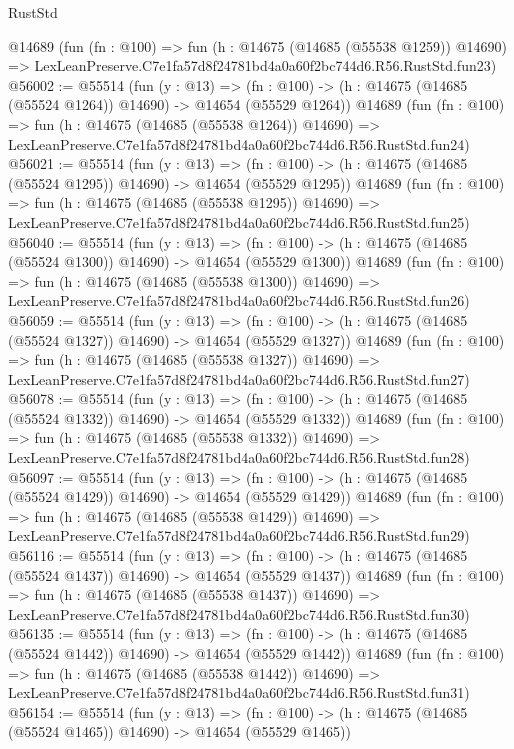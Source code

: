 \begin{lexlean}{RustStd}
\begin{coremodule}
    @14689
    (fun (fn : @100) =>
    fun (h : @14675 (@14685 (@55538 @1259)) @14690) =>
    LexLeanPreserve.C7e1fa57d8f24781bd4a0a60f2bc744d6.R56.RustStd.fun23)
@56002 := @55514
    (fun (y : @13) =>
    (fn : @100) -> (h : @14675 (@14685 (@55524 @1264)) @14690) -> @14654 (@55529 @1264))
    @14689
    (fun (fn : @100) =>
    fun (h : @14675 (@14685 (@55538 @1264)) @14690) =>
    LexLeanPreserve.C7e1fa57d8f24781bd4a0a60f2bc744d6.R56.RustStd.fun24)
@56021 := @55514
    (fun (y : @13) =>
    (fn : @100) -> (h : @14675 (@14685 (@55524 @1295)) @14690) -> @14654 (@55529 @1295))
    @14689
    (fun (fn : @100) =>
    fun (h : @14675 (@14685 (@55538 @1295)) @14690) =>
    LexLeanPreserve.C7e1fa57d8f24781bd4a0a60f2bc744d6.R56.RustStd.fun25)
@56040 := @55514
    (fun (y : @13) =>
    (fn : @100) -> (h : @14675 (@14685 (@55524 @1300)) @14690) -> @14654 (@55529 @1300))
    @14689
    (fun (fn : @100) =>
    fun (h : @14675 (@14685 (@55538 @1300)) @14690) =>
    LexLeanPreserve.C7e1fa57d8f24781bd4a0a60f2bc744d6.R56.RustStd.fun26)
@56059 := @55514
    (fun (y : @13) =>
    (fn : @100) -> (h : @14675 (@14685 (@55524 @1327)) @14690) -> @14654 (@55529 @1327))
    @14689
    (fun (fn : @100) =>
    fun (h : @14675 (@14685 (@55538 @1327)) @14690) =>
    LexLeanPreserve.C7e1fa57d8f24781bd4a0a60f2bc744d6.R56.RustStd.fun27)
@56078 := @55514
    (fun (y : @13) =>
    (fn : @100) -> (h : @14675 (@14685 (@55524 @1332)) @14690) -> @14654 (@55529 @1332))
    @14689
    (fun (fn : @100) =>
    fun (h : @14675 (@14685 (@55538 @1332)) @14690) =>
    LexLeanPreserve.C7e1fa57d8f24781bd4a0a60f2bc744d6.R56.RustStd.fun28)
@56097 := @55514
    (fun (y : @13) =>
    (fn : @100) -> (h : @14675 (@14685 (@55524 @1429)) @14690) -> @14654 (@55529 @1429))
    @14689
    (fun (fn : @100) =>
    fun (h : @14675 (@14685 (@55538 @1429)) @14690) =>
    LexLeanPreserve.C7e1fa57d8f24781bd4a0a60f2bc744d6.R56.RustStd.fun29)
@56116 := @55514
    (fun (y : @13) =>
    (fn : @100) -> (h : @14675 (@14685 (@55524 @1437)) @14690) -> @14654 (@55529 @1437))
    @14689
    (fun (fn : @100) =>
    fun (h : @14675 (@14685 (@55538 @1437)) @14690) =>
    LexLeanPreserve.C7e1fa57d8f24781bd4a0a60f2bc744d6.R56.RustStd.fun30)
@56135 := @55514
    (fun (y : @13) =>
    (fn : @100) -> (h : @14675 (@14685 (@55524 @1442)) @14690) -> @14654 (@55529 @1442))
    @14689
    (fun (fn : @100) =>
    fun (h : @14675 (@14685 (@55538 @1442)) @14690) =>
    LexLeanPreserve.C7e1fa57d8f24781bd4a0a60f2bc744d6.R56.RustStd.fun31)
@56154 := @55514
    (fun (y : @13) =>
    (fn : @100) -> (h : @14675 (@14685 (@55524 @1465)) @14690) -> @14654 (@55529 @1465))

\end{coremodule}
\end{lexlean}
